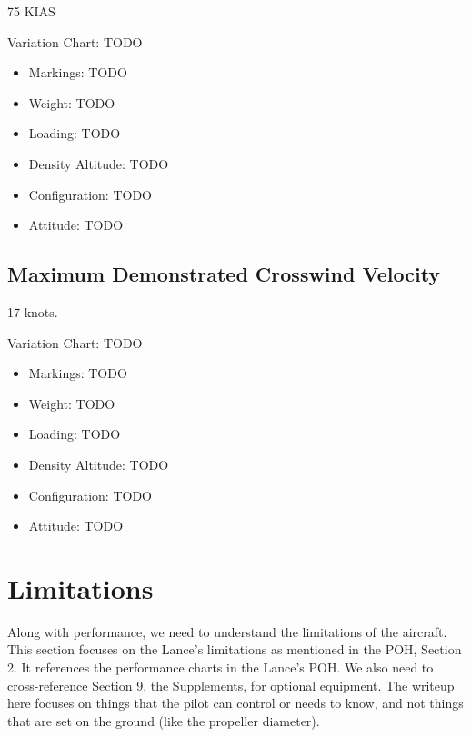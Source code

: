 75 KIAS

Variation Chart: TODO
\begin{itemize}
\item Markings: TODO
\item Weight: TODO
\item Loading: TODO
\item Density Altitude: TODO
\item Configuration: TODO
\item Attitude: TODO
\end{itemize}

\subsection{Maximum Demonstrated Crosswind Velocity}

17 knots.

Variation Chart: TODO
\begin{itemize}
\item Markings: TODO
\item Weight: TODO
\item Loading: TODO
\item Density Altitude: TODO
\item Configuration: TODO
\item Attitude: TODO
\end{itemize}

%
%

\section{Limitations}

Along with performance, we need to understand the limitations of the aircraft. This section focuses on the Lance's limitations as mentioned in the POH, Section 2. It references the performance charts in the Lance's POH. We also need to cross-reference Section 9, the Supplements, for optional equipment. The writeup here focuses on things that the pilot can control or needs to know, and not things that are set on the ground (like the propeller diameter).

